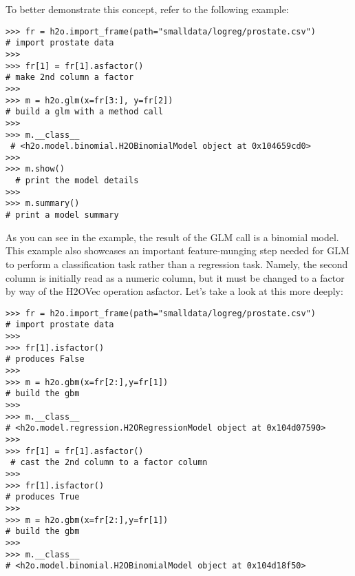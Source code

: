 To better demonstrate this concept, refer to the following example:
\begin{lstlisting}[style=python]
>>> fr = h2o.import_frame(path="smalldata/logreg/prostate.csv")  
# import prostate data
>>>
>>> fr[1] = fr[1].asfactor()                                     
# make 2nd column a factor
>>>
>>> m = h2o.glm(x=fr[3:], y=fr[2])                               
# build a glm with a method call
>>>
>>> m.__class__                                                 
 # <h2o.model.binomial.H2OBinomialModel object at 0x104659cd0>
>>>
>>> m.show()                                                   
  # print the model details
>>>
>>> m.summary()                                                  
# print a model summary
\end{lstlisting}


As you can see in the example, the result of the GLM call is a binomial model. This example also showcases an important feature-munging step needed for GLM to perform a classification task rather than a regression task. Namely, the second column is initially read as a numeric column, but it must be changed to a factor by way of the H2OVec operation asfactor. Let's take a look at this more deeply:

\begin{lstlisting}[style=python]
>>> fr = h2o.import_frame(path="smalldata/logreg/prostate.csv")  
# import prostate data
>>>
>>> fr[1].isfactor()                                             
# produces False
>>>
>>> m = h2o.gbm(x=fr[2:],y=fr[1])                                
# build the gbm
>>>
>>> m.__class__                                                  
# <h2o.model.regression.H2ORegressionModel object at 0x104d07590>
>>>
>>> fr[1] = fr[1].asfactor()                                    
 # cast the 2nd column to a factor column
>>>
>>> fr[1].isfactor()                                             
# produces True
>>>
>>> m = h2o.gbm(x=fr[2:],y=fr[1])                                
# build the gbm
>>>
>>> m.__class__                                                  
# <h2o.model.binomial.H2OBinomialModel object at 0x104d18f50>
\end{lstlisting}


